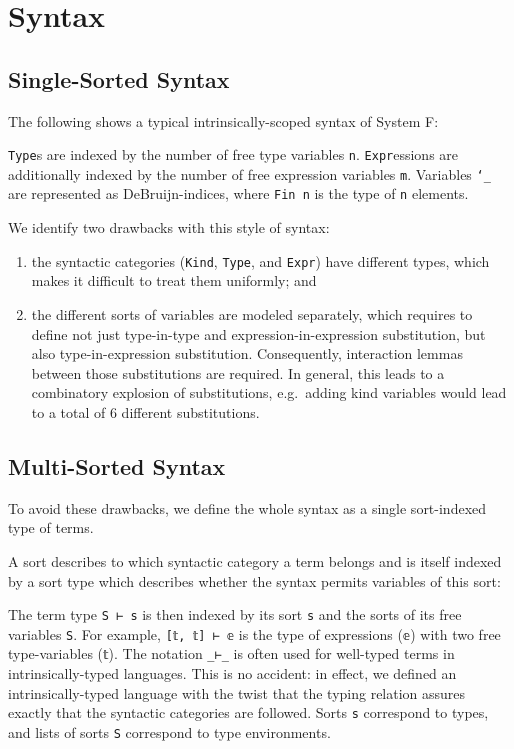 \documentclass[sigplan,10pt]{acmart}
\newenvironment{LibCode*}{%
  \begin{tcolorbox}[%
    colframe=white,%
    boxrule=0.0pt,%
    top=2.5pt,%
    left=2.5pt,%
    bottom=2.5pt,%
    right=2.5pt,%
    boxsep=0pt%
  ]\vspace{-0.2\baselineskip}%
}{%
  \vspace{-1\baselineskip}%
  \end{tcolorbox}%
}
\newenvironment{ExampleCode*}{%
  \begin{tcolorbox}[%
    colframe=white,%
    colback=yellow!5,%
    boxrule=0.0pt,%
    top=2.5pt,%
    left=2.5pt,%
    bottom=2.5pt,%
    right=2.5pt,%
    boxsep=0pt%
  ]\vspace{-0.2\baselineskip}%
}{%
  \vspace{-1\baselineskip}%
  \end{tcolorbox}%
}
\newcommand*\LibCode[1]{\begin{LibCode*}{#1}\end{LibCode*}}
\newcommand*\AppCode[1]{{#1}}
\newcommand*\ExampleCode[1]{\begin{ExampleCode*}{#1}\end{ExampleCode*}}
\begin{document}
  \newpage

  \section{Syntax}
  \subsection{Single-Sorted Syntax}
  The following shows a typical intrinsically-scoped syntax of System F:
  \ExampleCode\FUnsortedSyntax

  \texttt{Type}s are indexed by the number of free type variables \texttt{n}.
  \texttt{Expr}essions are additionally indexed by the number of free expression variables \texttt{m}.
  Variables \texttt{`\_} are represented as DeBruijn-indices, where \texttt{Fin n} is the type of \texttt{n} elements.

  We identify two drawbacks with this style of syntax:
  \begin{enumerate}
  \item the syntactic categories (\texttt{Kind}, \texttt{Type}, and \texttt{Expr})
    have different types, which makes it difficult to treat them uniformly; and
  \item the different sorts of variables are modeled separately, which requires to define not just
    type-in-type and expression-in-expression substitution, but also type-in-expression substitution.
    Consequently, interaction lemmas between those substitutions are required.
    In general, this leads to a combinatory explosion of
    substitutions, e.g.\ adding kind variables would lead to a total of 6
    different substitutions.
  \end{enumerate}

  \subsection{Multi-Sorted Syntax}
  To avoid these drawbacks, we define the whole syntax as a single sort-indexed type of terms.

  A sort describes to which syntactic category a term belongs and is
  itself indexed by a sort type which describes whether the syntax
  permits variables of this sort:
  \LibCode\KSortTy
  \AppCode\FSort
  
  The term type \texttt{S~⊢~s} is then indexed by its sort \texttt{s} and the sorts of its free variables \texttt{S}.
  For example, \texttt{[𝕥, 𝕥] ⊢ 𝕖} is the type of expressions (\texttt{𝕖}) with two free type-variables (\texttt{𝕥}).
  \newpage
  \AppCode\FSyntax
  The notation \texttt{\_⊢\_} is often used for well-typed terms in
  intrinsically-typed languages. This is no accident: in effect, we
  defined an intrinsically-typed language with the twist that the
  typing relation assures exactly that the syntactic categories are followed.
  Sorts \texttt{s} correspond to types, and lists of sorts \texttt{S}
  correspond to type environments.
\end{document}
